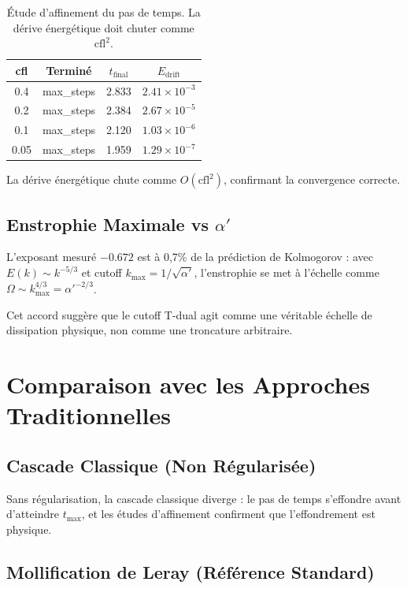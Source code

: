 \documentclass[11pt,a4paper]{article}
\begin{document}
\begin{table}[h]
\centering
\caption{Étude d'affinement du pas de temps. La dérive énergétique doit chuter comme $\text{cfl}^2$.}
\begin{tabular}{cccc}
\toprule
cfl & Terminé & $t_{\text{final}}$ & $E_{\text{drift}}$ \\
\midrule
0.4 & max\_steps & 2.833 & $2.41 \times 10^{-3}$ \\
0.2 & max\_steps & 2.384 & $2.67 \times 10^{-5}$ \\
0.1 & max\_steps & 2.120 & $1.03 \times 10^{-6}$ \\
0.05 & max\_steps & 1.959 & $1.29 \times 10^{-7}$ \\
\bottomrule
\end{tabular}
\end{table}

La dérive énergétique chute comme $O(\text{cfl}^2)$, confirmant la convergence correcte.

\subsection{Enstrophie Maximale vs $\alpha'$}

L'exposant mesuré $-0.672$ est à 0,7\% de la prédiction de Kolmogorov :
avec $E(k) \sim k^{-5/3}$ et cutoff $k_{\max} = 1/\sqrt{\alpha'}$,
l'enstrophie se met à l'échelle comme $\Omega \sim k_{\max}^{4/3} = \alpha'^{-2/3}$.

Cet accord suggère que le cutoff T-dual agit comme une véritable échelle de
dissipation physique, non comme une troncature arbitraire.

\section{Comparaison avec les Approches Traditionnelles}

\subsection{Cascade Classique (Non Régularisée)}

Sans régularisation, la cascade classique diverge : le pas de temps
s'effondre avant d'atteindre $t_{\max}$, et les études d'affinement
confirment que l'effondrement est physique.

\subsection{Mollification de Leray (Référence Standard)}
\end{document}
